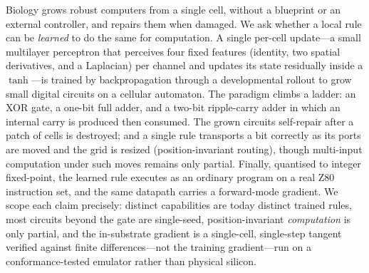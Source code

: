 Biology grows robust computers from a single cell, without a blueprint or an external controller, and repairs them when damaged. We ask whether a local rule can be \emph{learned} to do the same for computation. A single per-cell update---a small multilayer perceptron that perceives four fixed features (identity, two spatial derivatives, and a Laplacian) per channel and updates its state residually inside a $\tanh$---is trained by backpropagation through a developmental rollout to grow small digital circuits on a cellular automaton. The paradigm climbs a ladder: an XOR gate, a one-bit full adder, and a two-bit ripple-carry adder in which an internal carry is produced then consumed. The grown circuits self-repair after a patch of cells is destroyed; and a single rule transports a bit correctly as its ports are moved and the grid is resized (position-invariant routing), though multi-input computation under such moves remains only partial. Finally, quantised to integer fixed-point, the learned rule executes as an ordinary program on a real Z80 instruction set, and the same datapath carries a forward-mode gradient. We scope each claim precisely: distinct capabilities are today distinct trained rules, most circuits beyond the gate are single-seed, position-invariant \emph{computation} is only partial, and the in-substrate gradient is a single-cell, single-step tangent verified against finite differences---not the training gradient---run on a conformance-tested emulator rather than physical silicon.
